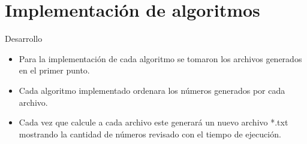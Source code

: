 \documentclass[11pt]{beamer}
\begin{document}
	\section{Implementación de algoritmos}
		\begin{frame}{Desarrollo}
			\justifying
			\begin{itemize}
			    \item Para la implementación de cada algoritmo se tomaron los archivos generados en el primer punto.
			    \item Cada algoritmo implementado ordenara los números generados por cada archivo.
			    \item Cada vez que calcule a cada archivo este generará un nuevo archivo *.txt mostrando la cantidad de números revisado con el tiempo de ejecución.
			\end{itemize}
		\end{frame}
		
\end{document}
